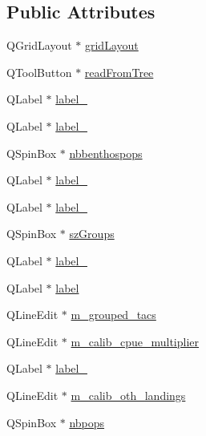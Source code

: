 \subsection*{Public Attributes}
\begin{DoxyCompactItemize}
\item 
Q\+Grid\+Layout $\ast$ \mbox{\hyperlink{class_ui___config_dialog_a7a2b0800d5e27a8f5759752cc7998094}{grid\+Layout}}
\item 
Q\+Tool\+Button $\ast$ \mbox{\hyperlink{class_ui___config_dialog_a3209c750f7bbb8f66fc3b44eb23f0510}{read\+From\+Tree}}
\item 
Q\+Label $\ast$ \mbox{\hyperlink{class_ui___config_dialog_a7cee83d511f42120e93f42d941aa202c}{label\+\_}}
\item 
Q\+Label $\ast$ \mbox{\hyperlink{class_ui___config_dialog_a9fbbbaf8d98db0f1ae3b1d675fd92588}{label\+\_}}
\item 
Q\+Spin\+Box $\ast$ \mbox{\hyperlink{class_ui___config_dialog_a90c73b33e578b8315d5b6f133973831c}{nbbenthospops}}
\item 
Q\+Label $\ast$ \mbox{\hyperlink{class_ui___config_dialog_a1da7380023f12b2337354028c4374b96}{label\+\_}}
\item 
Q\+Label $\ast$ \mbox{\hyperlink{class_ui___config_dialog_ae9a311187d1c75de1ec51c1d592c3d46}{label\+\_}}
\item 
Q\+Spin\+Box $\ast$ \mbox{\hyperlink{class_ui___config_dialog_a02c05abff3afc37b2043e28eb847cbfe}{sz\+Groups}}
\item 
Q\+Label $\ast$ \mbox{\hyperlink{class_ui___config_dialog_a33582bdd3ea212d17d0b5e71e64d9689}{label\+\_}}
\item 
Q\+Label $\ast$ \mbox{\hyperlink{class_ui___config_dialog_a28ad3bc0175ca5dc3dcf7597089df5ee}{label}}
\item 
Q\+Line\+Edit $\ast$ \mbox{\hyperlink{class_ui___config_dialog_a3be2739a9d03348813628db83fa6d636}{m\+\_\+grouped\+\_\+tacs}}
\item 
Q\+Line\+Edit $\ast$ \mbox{\hyperlink{class_ui___config_dialog_a69bbbbd4fca83c831cbb5335a157c404}{m\+\_\+calib\+\_\+cpue\+\_\+multiplier}}
\item 
Q\+Label $\ast$ \mbox{\hyperlink{class_ui___config_dialog_a4993b72c564cb67eef223b2891905688}{label\+\_}}
\item 
Q\+Line\+Edit $\ast$ \mbox{\hyperlink{class_ui___config_dialog_a6a90cac8508c9bfd88be5ec2a2dae1d4}{m\+\_\+calib\+\_\+oth\+\_\+landings}}
\item 
Q\+Spin\+Box $\ast$ \mbox{\hyperlink{class_ui___config_dialog_a5ea2736bb347b9bccd6317ce7ea83d6c}{nbpops}}

\end{DoxyCompactItemize}

